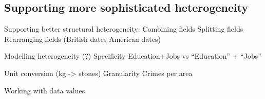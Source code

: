 \documentclass{sigchi}
\begin{document}
\subsection{Supporting more sophisticated heterogeneity}

Supporting better structural heterogeneity:
   Combining fields
   Splitting fields
   Rearranging fields (British dates American dates)
   
Modelling heterogeneity (?)
   Specificity  
     Education+Jobs vs ``Education'' + ``Jobs'' 

   Unit conversion (kg -> stones)
   Granularity
     Crimes per area

Working with data values









\end{document}
